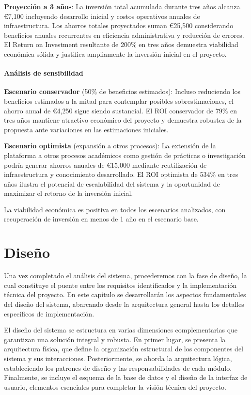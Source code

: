\documentclass[12pt,a4paper,oneside]{report}
\begin{document}
\textbf{Proyección a 3 años}: La inversión total acumulada durante tres años alcanza €7,100 incluyendo desarrollo inicial y costos operativos anuales de infraestructura. Los ahorros totales proyectados suman €25,500 considerando beneficios anuales recurrentes en eficiencia administrativa y reducción de errores. El Return on Investment resultante de 200\% en tres años demuestra viabilidad económica sólida y justifica ampliamente la inversión inicial en el proyecto.

\subsubsection{Análisis de
sensibilidad}\label{anuxe1lisis-de-sensibilidad}

\textbf{Escenario conservador} (50\% de beneficios estimados): Incluso reduciendo los beneficios estimados a la mitad para contemplar posibles sobrestimaciones, el ahorro anual de €4,250 sigue siendo sustancial. El ROI conservador de 79\% en tres años mantiene atractivo económico del proyecto y demuestra robustez de la propuesta ante variaciones en las estimaciones iniciales.

\textbf{Escenario optimista} (expansión a otros procesos): La extensión de la plataforma a otros procesos académicos como gestión de prácticas o investigación podría generar ahorros anuales de €15,000 mediante reutilización de infraestructura y conocimiento desarrollado. El ROI optimista de 534\% en tres años ilustra el potencial de escalabilidad del sistema y la oportunidad de maximizar el retorno de la inversión inicial.

La viabilidad económica es positiva en todos los escenarios analizados,
con recuperación de inversión en menos de 1 año en el escenario base.

\chapter{Diseño}\label{diseuxf1o}
Una vez completado el análisis del sistema, procederemos con la fase de
diseño, la cual constituye el puente entre los requisitos identificados
y la implementación técnica del proyecto. En este capítulo se
desarrollarán los aspectos fundamentales del diseño del sistema,
abarcando desde la arquitectura general hasta los detalles específicos
de implementación.

El diseño del sistema se estructura en varias dimensiones
complementarias que garantizan una solución integral y robusta. En
primer lugar, se presenta la arquitectura física, que define la
organización estructural de los componentes del sistema y sus
interacciones. Posteriormente, se aborda la arquitectura lógica,
estableciendo los patrones de diseño y las responsabilidades de cada
módulo. Finalmente, se incluye el esquema de la base de datos y el
diseño de la interfaz de usuario, elementos esenciales para completar la
visión técnica del proyecto.
\end{document}
